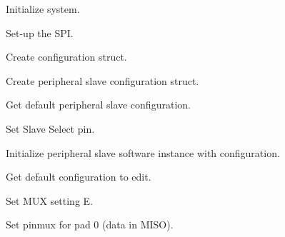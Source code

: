 \begin{DoxyEnumerate}
\item Initialize system. 
\begin{DoxyCodeInclude}{0}
\end{DoxyCodeInclude}

\item Set-\/up the S\+PI. 
\begin{DoxyCodeInclude}{0}
\end{DoxyCodeInclude}

\begin{DoxyEnumerate}
\item Create configuration struct. 
\begin{DoxyCodeInclude}{0}
\end{DoxyCodeInclude}

\item Create peripheral slave configuration struct. 
\begin{DoxyCodeInclude}{0}
\end{DoxyCodeInclude}

\item Get default peripheral slave configuration. 
\begin{DoxyCodeInclude}{0}
\end{DoxyCodeInclude}

\item Set Slave Select pin. 
\begin{DoxyCodeInclude}{0}
\end{DoxyCodeInclude}

\item Initialize peripheral slave software instance with configuration. 
\begin{DoxyCodeInclude}{0}
\end{DoxyCodeInclude}

\item Get default configuration to edit. 
\begin{DoxyCodeInclude}{0}
\end{DoxyCodeInclude}

\item Set M\+UX setting E. 
\begin{DoxyCodeInclude}{0}
\end{DoxyCodeInclude}

\item Set pinmux for pad 0 (data in M\+I\+SO). 
\begin{DoxyCodeInclude}{0}
\end{DoxyCodeInclude}


\end{DoxyEnumerate}
\end{DoxyEnumerate}
